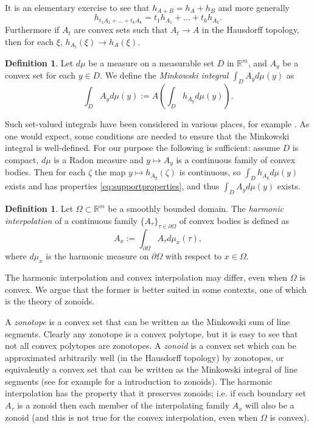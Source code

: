 \documentclass[reqno]{amsart}
\theoremstyle{definition}
\theoremstyle{definition}
\theoremstyle{definition}
\newtheorem{definition}[theorem]{Definition}
\begin{document}
It is an elementary exercise to see that $h_{A+B}=h_A+h_B$ and more generally $$h_{t_1A_1+...+t_kA_k}=t_1h_{A_1}+...+t_kh_{A_k}.$$
Furthermore if $A_t$ are convex sets such that $A_t\to A$ in the Hausdorff topology, then for each $\xi$, $h_{A_t}(\xi)\to h_A(\xi)$.    

\begin{definition}
Let $d\mu$ be a measure on a measurable set $D$ in $\mathbb R^m$, and $A_y$ be a convex set for each $y\in D$.    We define the \emph{Minkowski integral} $\int_D A_yd\mu(y)$ as $$\int_D A_yd\mu(y):=A\left(\int_D h_{A_y}d\mu(y)\right).$$
\end{definition}

Such set-valued integrals have been considered in various places, for example \cite{Aumann65,Vitale91}.  As one would expect, some conditions are needed to ensure that the Minkowski integral is well-defined.  For our purpose the following is sufficient: assume $D$ is compact, $d\mu$ is a Radon measure and $y\mapsto A_y$ is a continuous family of convex bodies.  Then for each $\zeta$ the map $y\mapsto h_{A_y}(\zeta)$ is continuous, so $\int_D h_{A_y}d\mu(y)$ exists and has properties \eqref{eq:supportproperties}, and thus $\int_D A_y d\mu(y)$ exists.



\begin{definition}
Let $\Omega\subset \mathbb R^m$ be a smoothly bounded domain. The \emph{harmonic interpolation} of a continuous family $\{A_{\tau}\}_{\tau\in \partial \Omega}$ of convex bodies is defined as $$A_x:=\int_{\partial \Omega}A_{\tau}d\mu_x(\tau),$$ where $d\mu_x$ is the harmonic measure on $\partial \Omega$ with respect to $x\in \Omega$.
\end{definition}

The harmonic interpolation and convex interpolation may differ, even when $\Omega$ is convex.   We argue that the former is better suited in some contexts, one of which is the theory of zonoids.

A \emph{zonotope} is a convex set that can be written as the Minkowski sum of line segments. Clearly any zonotope is a convex polytope, but it is easy to see that not all convex polytopes are zonotopes. A \emph{zonoid} is a convex set which can be approximated arbitrarily well (in the Hausdorff topology) by zonotopes, or equivalently a convex set that can be written as the Minkowski integral of line segments (see for example \cite{Schneider-Weil-Zonoidsandrelatedtopics} for a introduction to zonoids). The harmonic interpolation has the property that it preserves zonoids; i.e. if each boundary set $A_{\tau}$ is a zonoid then each member of the interpolating family $A_x$ will also be a zonoid (and this is not true for the convex interpolation, even when $\Omega$ is convex).
\end{document}
